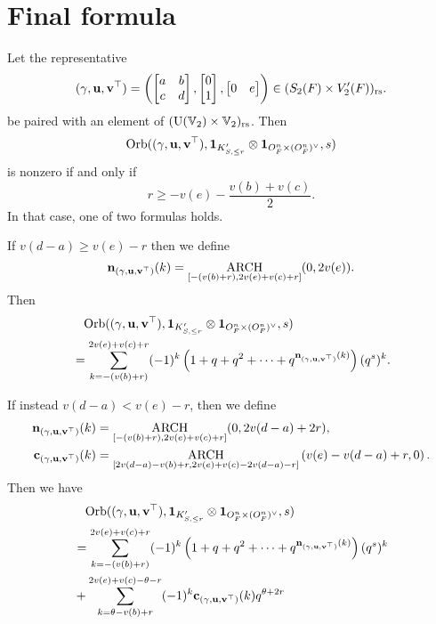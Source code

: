 \section{Final formula}
\begin{theorem}
  Let the representative
  \[
    {(\gamma, \mathbf u, \mathbf v^\top)} = \left( \begin{bmatrix} a & b \\ c & d \end{bmatrix},
      \begin{bmatrix} 0 \\ 1 \end{bmatrix},
      \begin{bmatrix} 0 & e \end{bmatrix} \right)
    \in (S_2(F) \times V_2'(F))_{\mathrm{rs}}.
  \]
  be paired with an element of $(\operatorname{U}(\mathbb V_2) \times \mathbb V_2)_{\mathrm{rs}}$.
  Then
  \[ \operatorname{Orb}({(\gamma, \mathbf u, \mathbf v^\top)}, \mathbf{1}_{K'_{S, \le r}} \otimes \mathbf{1}_{O_F^n \times (O_F^n)^\vee}, s) \]
  is nonzero if and only if
  \[ r \ge -v(e) - \frac{v(b)+v(c)}{2}. \]
  In that case, one of two formulas holds.

  If $v(d-a) \ge v(e) - r$ then we define
  \[ \mathbf n_{(\gamma, \mathbf u, \mathbf v^\top)}(k) = \operatorname*{ARCH}_{[-(v(b)+r), 2v(e)+v(c)+r]}(0, 2v(e)). \]
  Then
  \begin{align*}
    &\phantom= \Orb(\guv, \mathbf{1}_{K'_{S, \le r}} \otimes \oneV, s) \\
    &= \sum_{k = -(v(b)+r)}^{2v(e)+v(c)+r} (-1)^k
    \left( 1 + q + q^2 + \dots + q^{\nn_\guv(k)} \right) (q^s)^k.
  \end{align*}

  If instead $v(d-a) < v(e) - r$, then we define
  \begin{align*}
    \mathbf n_{(\gamma, \mathbf u, \mathbf v^\top)}(k)
      &= \operatorname*{ARCH}_{[-(v(b)+r), 2v(e)+v(c)+r]}(0, 2v(d-a) + 2r), \\
    \mathbf c_{(\gamma, \mathbf u, \mathbf v^\top)}(k) &=
      \operatorname*{ARCH}_{[2v(d-a)-v(b)+r, 2v(e)+v(c)-2v(d-a)-r]}\left( v(e) - v(d-a) + r, 0 \right).
  \end{align*}
  Then we have
  \begin{align*}
    &\phantom= \Orb(\guv, \mathbf{1}_{K'_{S, \le r}} \otimes \oneV, s) \\
    &= \sum_{k = -(v(b)+r)}^{2v(e)+v(c)+r} (-1)^k
    \left( 1 + q + q^2 + \dots + q^{\nn_\guv(k)} \right) (q^s)^k \\
    &+ \sum_{k = \theta-v(b)+r}^{2v(e)+v(c)-\theta-r} (-1)^k \cc_\guv(k) q^{\theta + 2r}
  \end{align*}
\end{theorem}

